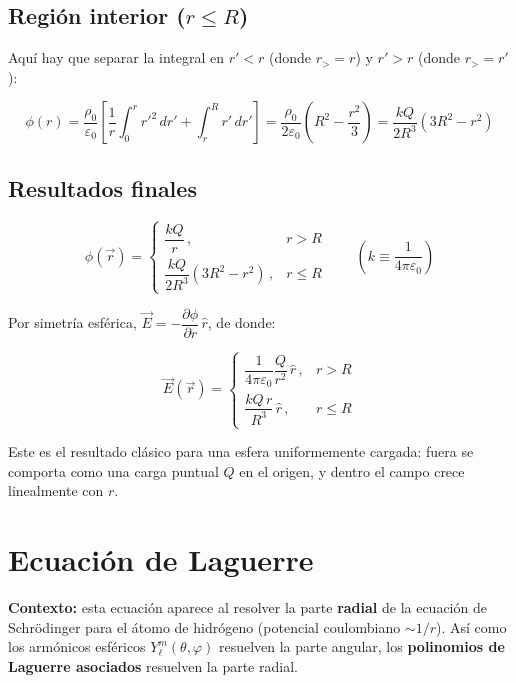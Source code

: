 \documentclass[a4paper]{article}
\begin{document}
\subsection{\texorpdfstring{Región interior ($r\le R$)}{Región interior}}


Aquí hay que separar la integral en $r'<r$ (donde $r_>=r$) y $r'>r$ (donde $r_>=r'$):

\[
\phi(r)=\frac{\rho_0}{\varepsilon_0}\left[\frac{1}{r}\int_0^{r}r'^2\,dr'+\int_{r}^{R}r'\,dr'\right]=\frac{\rho_0}{2\varepsilon_0}\left(R^2-\frac{r^2}{3}\right)=\frac{kQ}{2R^3}\left(3R^2-r^2\right)
\]


\subsection{Resultados finales}


\[
\boxed{\phi(\vec r)=\begin{cases}\dfrac{kQ}{r}\,, & r>R\\[3mm] \dfrac{kQ}{2R^3}\left(3R^2-r^2\right)\,, & r\le R\end{cases}}\qquad\left(k\equiv\dfrac{1}{4\pi\varepsilon_0}\right)
\]


Por simetría esférica, $\vec E=-\dfrac{\partial\phi}{\partial r}\,\hat r$, de donde:

\[
\boxed{\vec E(\vec r)=\begin{cases}\dfrac{1}{4\pi\varepsilon_0}\dfrac{Q}{r^2}\,\hat r\,, & r>R\\[3mm] \dfrac{kQ\,r}{R^3}\,\hat r\,, & r\le R\end{cases}}
\]


Este es el resultado clásico para una esfera uniformemente cargada: fuera se comporta como una carga puntual $Q$ en el origen, y dentro el campo crece linealmente con $r$.

\medskip


\section{Ecuación de Laguerre}


\begin{tcolorbox}[colback=blue!3, colframe=blue!35!black, title={Nota}, fonttitle=\bfseries]
\textbf{Contexto:} esta ecuación aparece al resolver la parte \textbf{radial} de la ecuación de Schrödinger para el átomo de hidrógeno (potencial coulombiano $\sim 1/r$). Así como los armónicos esféricos $Y_\ell^m(\theta,\varphi)$ resuelven la parte angular, los \textbf{polinomios de Laguerre asociados} resuelven la parte radial.

\end{tcolorbox}
\end{document}
